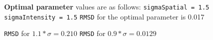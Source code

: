 \documentclass{article}
\begin{document}
\newpage
\textbf{Optimal parameter} values are as follows: \newline
\texttt{sigmaSpatial = 1.5} \newline
\texttt{sigmaIntensity = 1.5} \newline  
\texttt{RMSD} for the optimal parameter is 0.017

\vskip 0.2in

\texttt{RMSD} for \(1.1*\sigma = 0.210\) \newline
\texttt{RMSD} for \(0.9*\sigma = 0.0129\) 
\end{document}
